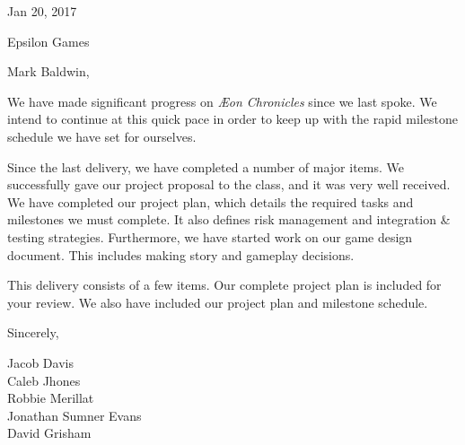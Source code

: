 \documentclass[12pt]{article}
\newcommand\tab[1][.5in]{\hspace*{#1}}
\begin{document}
\hfill Jan 20, 2017

\hfill Epsilon Games

Mark Baldwin,

We have made significant progress on \textit{{\AE}on Chronicles} since we last
spoke. We intend to continue at this quick pace in order to keep up with the
rapid milestone schedule we have set for ourselves.

Since the last delivery, we have completed a number of major items. We
successfully gave our project proposal to the class, and it was very well
received. We have completed our project plan, which details the required
tasks and milestones we must complete. It also defines risk management
and integration \& testing strategies. Furthermore, we have started work on
our game design document. This includes making story and gameplay decisions.

This delivery consists of a few items. Our complete project plan is included
for your review. We also have included our project plan and milestone schedule.

Sincerely,

\tab Jacob Davis \\
\tab Caleb Jhones \\
\tab Robbie Merillat \\
\tab Jonathan Sumner Evans \\
\tab David Grisham \\
\end{document}
